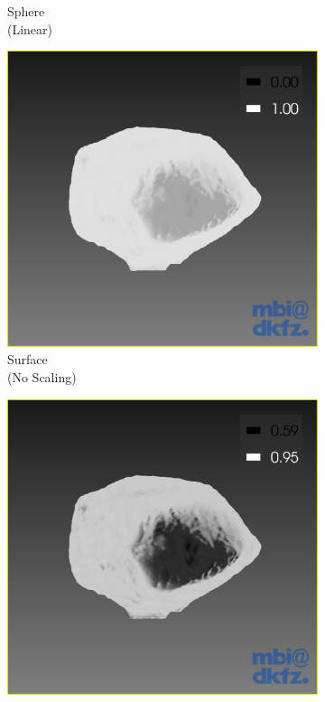 \begin{figure}[H]
\begin{subfigure}[b]{0.25\textwidth}
    \caption*{Sphere\\(Linear)}
    \label{fig:surfacespherescaling}
  \end{subfigure}%
  \begin{subfigure}[b]{0.25\textwidth}
    \includegraphics[width=\textwidth]{images/surface/surface_no_scaling.png}
    \caption*{Surface\\(No Scaling)}
    \label{fig:surfacesurfacenoscaling}
  \end{subfigure}%
  \begin{subfigure}[b]{0.25\textwidth}
    \includegraphics[width=\textwidth]{images/surface/surface_scaling.png}

\end{subfigure}
\end{figure}
